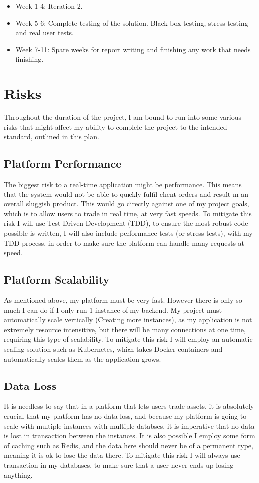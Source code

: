 \documentclass[titlepage]{article}
\begin{document}
\begin{itemize}
	\item Week 1-4: Iteration 2.
	\item Week 5-6: Complete testing of the solution. Black box testing, stress testing and real user tests.
	\item Week 7-11: Spare weeks for report writing and finishing any work that needs finishing.
\end{itemize}

\pagebreak

\section{Risks}
Throughout  the duration of the project, I am bound to run into some various risks that might affect my ability to complele the project to the intended standard, outlined in this plan.

\subsection{Platform Performance}
The biggest risk to a real-time application might be performance. This means that the system would not be able to quickly fulfil client orders and result in an overall sluggish product. This would go directly against one of my project goals, which is to allow users to trade in real time, at very fast speeds. To mitigate this risk I will use Test Driven Development (TDD), to ensure the most robust code possible is written, I will also include performance tests (or stress tests), with my TDD process, in order to make sure the platform can handle many requests at speed.

\subsection{Platform Scalability}
As mentioned above, my platform must be very fast. However there is only so much I can do if I only run 1 instance of my backend. My project must automatically scale vertically (Creating more instances), as my application is not extremely resource intensitive, but there will be many connections at one time, requiring this type of scalability. To mitigate this risk I will employ an automatic scaling solution such as Kubernetes, which takes Docker containers and automatically scales them as the application grows.

\subsection{Data Loss}
It is needless to say that in a platform that lets users trade assets, it is absolutely crucial that my platform has no data loss, and because my platform is going to scale with multiple instances with multiple databses, it is imperative that no data is lost in transaction between the instances. It is also possible I employ some form of caching such as Redis, and the data here should never be of a permanent type, meaning it is ok to lose the data there. To mitigate this risk I will always use transaction in my databases, to make sure that a user never ends up losing anything.
\end{document}

